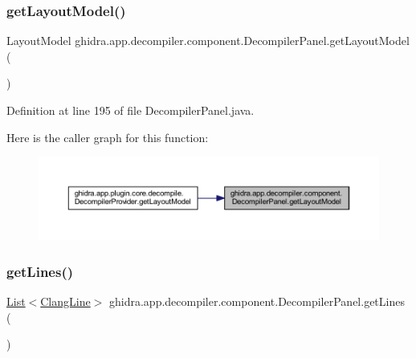 \subsubsection{\texorpdfstring{getLayoutModel()}{getLayoutModel()}}
{\footnotesize\ttfamily Layout\+Model ghidra.\+app.\+decompiler.\+component.\+Decompiler\+Panel.\+get\+Layout\+Model (\begin{DoxyParamCaption}{ }\end{DoxyParamCaption})\hspace{0.3cm}{\ttfamily [inline]}}



Definition at line 195 of file Decompiler\+Panel.\+java.

Here is the caller graph for this function\+:
\nopagebreak
\begin{figure}[H]
\begin{center}
\leavevmode
\includegraphics[width=350pt]{classghidra_1_1app_1_1decompiler_1_1component_1_1_decompiler_panel_a82fded4495c1e52154d64e6820b01c29_icgraph}
\end{center}
\end{figure}
\mbox{\label{classghidra_1_1app_1_1decompiler_1_1component_1_1_decompiler_panel_ac6a17842ff6c5027d099161ea5a8a462}} 
\subsubsection{\texorpdfstring{getLines()}{getLines()}}
{\footnotesize\ttfamily \mbox{\hyperlink{xml_8hh_ab5ab62f46b3735557c125f91b40ac155}{List}}$<$\mbox{\hyperlink{classghidra_1_1app_1_1decompiler_1_1_clang_line}{Clang\+Line}}$>$ ghidra.\+app.\+decompiler.\+component.\+Decompiler\+Panel.\+get\+Lines (\begin{DoxyParamCaption}{ }\end{DoxyParamCaption})\hspace{0.3cm}{\ttfamily [inline]}}



